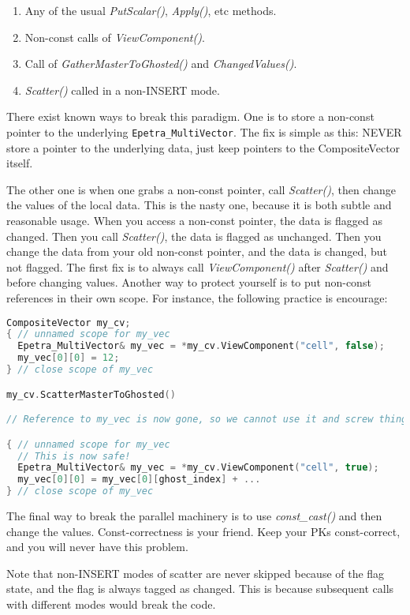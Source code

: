\begin{enumerate}
\item Any of the usual {\it PutScalar()}, {\it Apply()}, etc methods.
\item Non-const calls of {\it ViewComponent()}.
\item Call of {\it GatherMasterToGhosted()} and {\it ChangedValues()}.
\item {\it Scatter()} called in a non-INSERT mode.
\end{enumerate}

There exist known ways to break this paradigm. 
One is to store a non-const pointer to the underlying {\tt Epetra\_MultiVector}.
The fix is simple as this: NEVER store a pointer to the underlying data, 
just keep pointers to the CompositeVector itself.

The other one is when one grabs a non-const pointer, call {\it Scatter()}, then 
change the values of the local data.  
This is the nasty one, because it is both subtle and reasonable usage.
When you access a non-const pointer, the data is flagged as changed.
Then you call {\it Scatter()}, the data is flagged as unchanged.
Then you change the data from your old non-const pointer, and the data is changed, but not flagged.
The first fix is to always call {\it ViewComponent()} after {\it Scatter()} and before changing values.
Another way to protect yourself is to put non-const references in their own scope.
For instance, the following practice is encourage:
\begin{lstlisting}[language=C++]
CompositeVector my_cv;
{ // unnamed scope for my_vec
  Epetra_MultiVector& my_vec = *my_cv.ViewComponent("cell", false);
  my_vec[0][0] = 12;
} // close scope of my_vec

my_cv.ScatterMasterToGhosted()

// Reference to my_vec is now gone, so we cannot use it and screw things up!

{ // unnamed scope for my_vec
  // This is now safe!
  Epetra_MultiVector& my_vec = *my_cv.ViewComponent("cell", true);
  my_vec[0][0] = my_vec[0][ghost_index] + ...
} // close scope of my_vec
\end{lstlisting}

The final way to break the parallel machinery is to use {\it const\_cast()} and 
then change the values.
Const-correctness is your friend. Keep your PKs const-correct, and you will never have this problem.

Note that non-INSERT modes of scatter are never skipped because of the flag state, 
and the flag is always tagged as changed.  
This is because subsequent calls with different modes would break the code.


